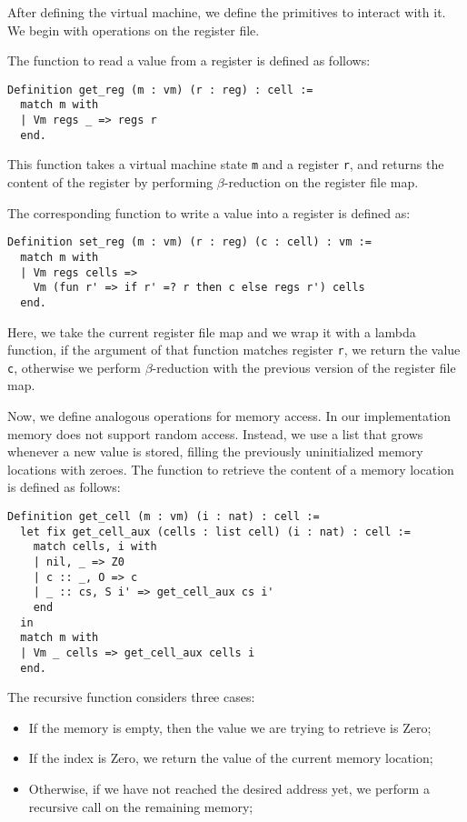 After defining the virtual machine, we define the primitives to interact with it. We begin with operations on the register file.

The function to read a value from a register is defined as follows:

\begin{lstlisting}[style=Rocq]
Definition get_reg (m : vm) (r : reg) : cell :=
  match m with
  | Vm regs _ => regs r
  end.
\end{lstlisting}

This function takes a virtual machine state \texttt m and a register \texttt r, and returns the content of the register  by performing $\beta$-reduction on the register file map.

The corresponding function to write a value into a register is defined as:

\begin{lstlisting}[style=Rocq]
Definition set_reg (m : vm) (r : reg) (c : cell) : vm :=
  match m with
  | Vm regs cells =>
    Vm (fun r' => if r' =? r then c else regs r') cells
  end.
\end{lstlisting}

Here, we take the current register file map and we wrap it with a lambda function, if the argument of that function matches register \texttt r, we return the value \texttt c, otherwise we perform $\beta$-reduction with the previous version of the register file map.

Now, we define analogous operations for memory access. In our implementation memory does not support random access. Instead, we use a list that grows whenever a new value is stored, filling the previously uninitialized memory locations with zeroes. The function to retrieve the content of a memory location is defined as follows:

\begin{lstlisting}[style=Rocq]
Definition get_cell (m : vm) (i : nat) : cell :=
  let fix get_cell_aux (cells : list cell) (i : nat) : cell :=
    match cells, i with
    | nil, _ => Z0
    | c :: _, O => c
    | _ :: cs, S i' => get_cell_aux cs i'
    end
  in
  match m with
  | Vm _ cells => get_cell_aux cells i
  end.
\end{lstlisting}

The recursive function considers three cases:
\begin{itemize}
  \item If the memory is empty, then the value we are trying to retrieve is Zero;
  \item If the index is Zero, we return the value of the current memory location;
  \item Otherwise, if we have not reached the desired address yet, we perform a recursive call on the remaining memory;
\end{itemize}

